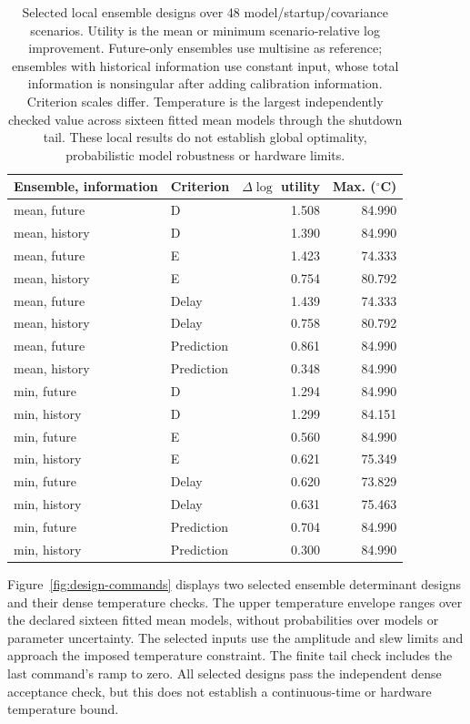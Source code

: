 \documentclass[11pt]{article}
\begin{document}
\begin{table}[tbp]
\centering\small
\begin{tabular}{llrr}
\toprule
Ensemble, information & Criterion & $\Delta\log$ utility & Max. (${}^\circ$C) \\
\midrule
mean, future & D & 1.508 & 84.990 \\
mean, history & D & 1.390 & 84.990 \\
mean, future & E & 1.423 & 74.333 \\
mean, history & E & 0.754 & 80.792 \\
mean, future & Delay & 1.439 & 74.333 \\
mean, history & Delay & 0.758 & 80.792 \\
mean, future & Prediction & 0.861 & 84.990 \\
mean, history & Prediction & 0.348 & 84.990 \\
min, future & D & 1.294 & 84.990 \\
min, history & D & 1.299 & 84.151 \\
min, future & E & 0.560 & 84.990 \\
min, history & E & 0.621 & 75.349 \\
min, future & Delay & 0.620 & 73.829 \\
min, history & Delay & 0.631 & 75.463 \\
min, future & Prediction & 0.704 & 84.990 \\
min, history & Prediction & 0.300 & 84.990 \\
\bottomrule
\end{tabular}
\caption{Selected local ensemble designs over 48 model/startup/covariance scenarios. Utility is the mean or minimum scenario-relative log improvement. Future-only ensembles use multisine as reference; ensembles with historical information use constant input, whose total information is nonsingular after adding calibration information. Criterion scales differ. Temperature is the largest independently checked value across sixteen fitted mean models through the shutdown tail. These local results do not establish global optimality, probabilistic model robustness or hardware limits.}
\label{tab:parameter-design}
\end{table}



Figure~\ref{fig:design-commands} displays two selected ensemble determinant
designs and their dense temperature checks. The upper temperature envelope
ranges over the declared sixteen fitted mean models, without probabilities
over models or parameter uncertainty. The selected inputs use the amplitude
and slew limits and approach the imposed temperature constraint. The finite
tail check includes the last command's ramp to zero. All selected designs pass
the independent dense acceptance check, but this does not establish a
continuous-time or hardware temperature bound.
\end{document}
